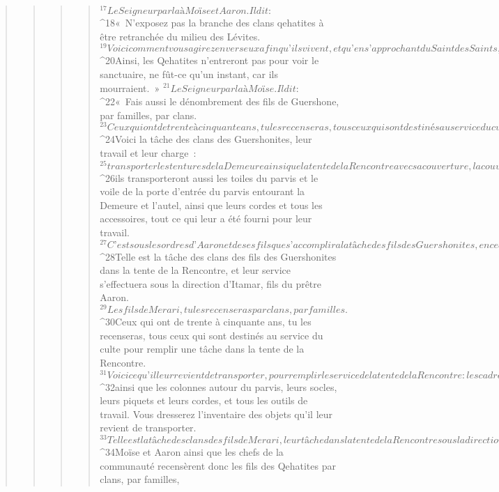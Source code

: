 \begin{verse}
\begin{verse}
\begin{verse}
\begin{verse}
${}^{17}Le Seigneur parla à Moïse et Aaron. Il dit : 
${}^{18}« N’exposez pas la branche des clans qehatites à être retranchée du milieu des Lévites. 
${}^{19}Voici comment vous agirez envers eux afin qu’ils vivent, et qu’en s’approchant du Saint des Saints, ils ne meurent pas : Aaron et ses fils viendront et affecteront les uns à leur travail, et les autres à la charge du transport. 
${}^{20}Ainsi, les Qehatites n’entreront pas pour voir le sanctuaire, ne fût-ce qu’un instant, car ils mourraient. »
${}^{21}Le Seigneur parla à Moïse. Il dit : 
${}^{22}« Fais aussi le dénombrement des fils de Guershone, par familles, par clans. 
${}^{23}Ceux qui ont de trente à cinquante ans, tu les recenseras, tous ceux qui sont destinés au service du culte pour remplir une tâche dans la tente de la Rencontre. 
${}^{24}Voici la tâche des clans des Guershonites, leur travail et leur charge : 
${}^{25}transporter les tentures de la Demeure ainsi que la tente de la Rencontre avec sa couverture, la couverture en dauphin qui est au-dessus d’elle, et le voile d’entrée de la tente de la Rencontre ; 
${}^{26}ils transporteront aussi les toiles du parvis et le voile de la porte d’entrée du parvis entourant la Demeure et l’autel, ainsi que leurs cordes et tous les accessoires, tout ce qui leur a été fourni pour leur travail. 
${}^{27}C’est sous les ordres d’Aaron et de ses fils que s’accomplira la tâche des fils des Guershonites, en ce qui concerne toute la charge du transport et tout leur travail ; vous aurez autorité pour surveiller tout le transport. 
${}^{28}Telle est la tâche des clans des fils des Guershonites dans la tente de la Rencontre, et leur service s’effectuera sous la direction d’Itamar, fils du prêtre Aaron.
${}^{29}Les fils de Merari, tu les recenseras par clans, par familles. 
${}^{30}Ceux qui ont de trente à cinquante ans, tu les recenseras, tous ceux qui sont destinés au service du culte pour remplir une tâche dans la tente de la Rencontre. 
${}^{31}Voici ce qu’il leur revient de transporter, pour remplir le service de la tente de la Rencontre : les cadres de la Demeure, ses traverses, ses colonnes et ses socles, 
${}^{32}ainsi que les colonnes autour du parvis, leurs socles, leurs piquets et leurs cordes, et tous les outils de travail. Vous dresserez l’inventaire des objets qu’il leur revient de transporter. 
${}^{33}Telle est la tâche des clans des fils de Merari, leur tâche dans la tente de la Rencontre sous la direction d’Itamar, fils du prêtre Aaron. »
${}^{34}Moïse et Aaron ainsi que les chefs de la communauté recensèrent donc les fils des Qehatites par clans, par familles, 

\end{verse}
\end{verse}
\end{verse}
\end{verse}

